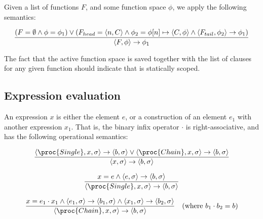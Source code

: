 Given a list of functions $F$, and some function space $\phi$, we apply the
following semantics:

\begin{equation}\label{sem:declaration}
{\displaystyle
  \left(
      F=\emptyset
    \wedge
      \phi=\phi_1
  \right)
  \vee
  \left(
      F_{head}=\left\langle n,C\right\rangle
    \wedge
      \phi_2=\phi[n]\mapsto \left\langle C,\phi\right\rangle
    \wedge
      \left\langle F_{tail},\phi_2\right\rangle
      \rightarrow
      \phi_1
  \right)
\over\displaystyle
  \left\langle F, \phi\right\rangle
  \rightarrow
  \phi_1
}
\end{equation}

The fact that the active function space is saved together with the list of
clauses for any given function should indicate that \D{} is statically scoped.

\subsection{Expression evaluation}

An expression $x$ is either the element $e$, or a construction of an element
$e_1$ with another expression $x_1$. That is, the binary infix operator $\cdot$
is right-associative, and has the following operational semantics:

\everymath{\displaystyle}

\begin{equation}
{\displaystyle
  \left\langle \proc{Single}, x,\sigma\right\rangle
  \rightarrow
  \left\langle b,\sigma\right\rangle
\vee
  \left\langle \proc{Chain}, x,\sigma\right\rangle
  \rightarrow
  \left\langle b,\sigma\right\rangle
\over\displaystyle
  \left\langle x,\sigma\right\rangle
  \rightarrow
  \left\langle b,\sigma\right\rangle
}
\end{equation}

\begin{equation}
{\displaystyle
  x = e
\wedge
  \left\langle e,\sigma\right\rangle
  \rightarrow
  \left\langle b,\sigma\right\rangle
\over\displaystyle
  \left\langle \proc{Single}, x,\sigma\right\rangle
  \rightarrow
  \left\langle b,\sigma\right\rangle
}
\end{equation}

\begin{equation}
{\displaystyle
  x = e_1\cdot x_1
\wedge
  \left\langle e_1,\sigma\right\rangle
  \rightarrow
  \left\langle b_1,\sigma\right\rangle
\wedge
  \left\langle x_1,\sigma\right\rangle
  \rightarrow
  \left\langle b_2,\sigma\right\rangle
\over\displaystyle
  \left\langle \proc{Chain}, x, \sigma\right\rangle
  \rightarrow
  \left\langle b, \sigma\right\rangle
}
\quad(\text{where }b_1\cdot b_2=b)
\end{equation}

